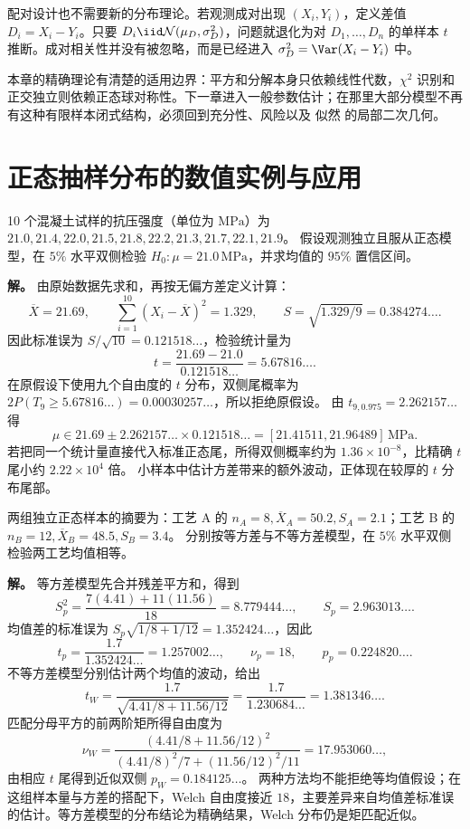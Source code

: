 配对设计也不需要新的分布理论。若观测成对出现 $(X_i,Y_i)$，定义差值 $D_i=X_i-Y_i$。只要 $D_i\iid\mathcal N(\mu_D,\sigma_D^2)$，问题就退化为对 $D_1,\ldots,D_n$ 的单样本 $t$ 推断。成对相关性并没有被忽略，而是已经进入 $\sigma_D^2=\Var(X_i-Y_i)$ 中。

本章的精确理论有清楚的适用边界：平方和分解本身只依赖线性代数，$\chi^2$ 识别和正交独立则依赖正态球对称性。下一章进入一般参数估计；在那里大部分模型不再有这种有限样本闭式结构，必须回到充分性、风险以及 似然 的局部二次几何。

\section{正态抽样分布的数值实例与应用}\label{sec:gaussian-sampling-examples}
\begin{exbox}[混凝土抗压强度检验]
10 个混凝土试样的抗压强度（单位为 $\si{\mega\pascal}$）为
$21.0,21.4,22.0,21.5,21.8,22.2,21.3,21.7,22.1,21.9$。
假设观测独立且服从正态模型，在 $5\%$ 水平双侧检验 $H_0:\mu=21.0\,\si{\mega\pascal}$，并求均值的 $95\%$ 置信区间。

\textbf{解。} 由原始数据先求和，再按无偏方差定义计算：
\[
 \overline X=21.69,\qquad
 \sum_{i=1}^{10}(X_i-\overline X)^2=1.329,
 \qquad S=\sqrt{1.329/9}=0.384274\ldots.
\]
因此标准误为 $S/\sqrt{10}=0.121518\ldots$，检验统计量为
\[
 t=\frac{21.69-21.0}{0.121518\ldots}=5.67816\ldots.
\]
在原假设下使用九个自由度的 $t$ 分布，双侧尾概率为
$2P(T_9\ge5.67816\ldots)=0.00030257\ldots$，所以拒绝原假设。
由 $t_{9,0.975}=2.262157\ldots$ 得
\[
 \mu\in21.69\pm2.262157\ldots\times0.121518\ldots
 =[21.41511,21.96489]\,\si{\mega\pascal}.
\]
若把同一个统计量直接代入标准正态尾，所得双侧概率约为
$1.36\times10^{-8}$，比精确 $t$ 尾小约 $2.22\times10^4$ 倍。
小样本中估计方差带来的额外波动，正体现在较厚的 $t$ 分布尾部。
\end{exbox}
\begin{exbox}[两种工艺的均值比较]
两组独立正态样本的摘要为：工艺 A 的 $n_A=8,\overline X_A=50.2,S_A=2.1$；工艺 B 的 $n_B=12,\overline X_B=48.5,S_B=3.4$。
分别按等方差与不等方差模型，在 $5\%$ 水平双侧检验两工艺均值相等。

\textbf{解。} 等方差模型先合并残差平方和，得到
\[
 S_p^2=\frac{7(4.41)+11(11.56)}{18}=8.779444\ldots,
 \qquad S_p=2.963013\ldots.
\]
均值差的标准误为 $S_p\sqrt{1/8+1/12}=1.352424\ldots$，因此
\[
 t_p=\frac{1.7}{1.352424\ldots}=1.257002\ldots,
 \qquad\nu_p=18,\qquad p_p=0.224820\ldots.
\]
不等方差模型分别估计两个均值的波动，给出
\[
 t_W=\frac{1.7}{\sqrt{4.41/8+11.56/12}}
 =\frac{1.7}{1.230684\ldots}=1.381346\ldots.
\]
匹配分母平方的前两阶矩所得自由度为
\[
 \nu_W=
 \frac{(4.41/8+11.56/12)^2}
 {(4.41/8)^2/7+(11.56/12)^2/11}
 =17.953060\ldots,
\]
由相应 $t$ 尾得到近似双侧 $p_W=0.184125\ldots$。
两种方法均不能拒绝等均值假设；在这组样本量与方差的搭配下，Welch 自由度接近 $18$，主要差异来自均值差标准误的估计。等方差模型的分布结论为精确结果，Welch 分布仍是矩匹配近似。
\end{exbox}
